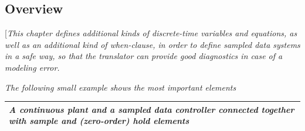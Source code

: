 \documentclass[10pt,a4paper]{report}
\def\doublelabel#1{\label{#1}}
\begin{document}
\subsection{Overview}\doublelabel{overview}

{[}\emph{This chapter defines additional kinds of discrete-time
variables and equations, as well as an additional kind of when-clause,
in order to define sampled data systems in a safe way, so that the
translator can provide good diagnostics in case of a modeling error. }

\emph{The following small example shows the most important elements}

\begin{longtable}[]{@{}l@{}}
\hline \endhead
\begin{minipage}[t]{0.97\columnwidth}\raggedright
\emph{A continuous plant and a sampled data controller connected
together with sample and (zero-order) hold elements}
\end{minipage}\\ \hline

\end{longtable}
\end{document}
